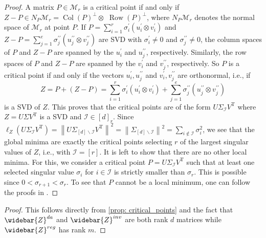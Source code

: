 \documentclass{article}
\newcommand{\T}{\mathrm{T}}
\theoremstyle{plain}
\theoremstyle{definition}
\theoremstyle{remark}
\theoremstyle{remark}
\begin{document}
 \begin{proof}
  A matrix $P \in \mathcal{M}_r$ is a critical point if and only if $Z-P \in N_P \mathcal{M}_r=\operatorname{Col}(P)^{\perp} \otimes$ $\operatorname{Row}(P)^{\perp}$, where $N_P \mathcal{M}_r$ denotes the normal space of $\mathcal{M}_r$ at point $P$. 
  If $P=\sum_{i=1}^r \sigma_i^{\prime}\left(u_i^{\prime} \otimes v_i^{\prime}\right)$ and $Z-P=\sum_{j=1}^e \sigma_j^{\prime \prime}\left(u_j^{\prime \prime} \otimes v_j^{\prime \prime}\right)$ are SVD with $\sigma_i^{\prime} \neq 0$ and $\sigma_j^{\prime \prime} \neq 0$, the column spaces of $P$ and $Z-P$ are spanned by the $u_i^{\prime}$ and $u_j^{\prime \prime}$, respectively. Similarly, the row spaces of $P$ and $Z-P$ are spanned by the $v_i^{\prime}$ and $v_j^{\prime \prime}$, respectively. So $P$ is a critical point if and only if the vectors $u_i^{\prime}, u_j^{\prime \prime}$ and $v_i^{\prime}, v_j^{\prime \prime}$ are orthonormal, i.e., if
  \begin{equation*}
    Z=P+\left(Z-P\right)=\sum_{i=1}^r \sigma_i^{\prime}\left(u_i^{\prime} \otimes v_i^{\prime}\right)+\sum_{j=1}^e \sigma_j^{\prime \prime}\left(u_j^{\prime \prime} \otimes v_j^{\prime \prime}\right)
  \end{equation*}
  is a SVD of $Z$. This proves that the critical points are of the form $U \Sigma_{\mathcal{I}} V^\T$ where $Z=U \Sigma V^\T$ is a SVD and $\mathcal{I} \in[d]_r$. Since $\ell_{Z}\left(U \Sigma_{\mathcal{I}} V^\T\right)=\left\|U \Sigma_{[d] \backslash \mathcal{I}} V^\T\right\|^2=\left\|\Sigma_{[d] \backslash \mathcal{I}}\right\|^2=\sum_{i \notin \mathcal{I}} \sigma_i^2$, we see that the global minima are exactly the critical points selecting $r$ of the largest singular values of $Z$, i.e., with $\mathcal{I}=[r]$. It is left to show that there are no other local minima. For this, we consider a critical point $P=U \Sigma_{\mathcal{I}} V^\T$ such that at least one selected singular value $\sigma_i$ for $i \in \mathcal{I}$ is strictly smaller than $\sigma_r$. This is possible since $0 < \sigma_{r+1} < \sigma_r$. To see that $P$ cannot be a local minimum, one can follow the proofs in \citep[Theorem 28]{Trager2020Pure}.
 \end{proof}

 \corcritcalpoints*
 \begin{proof}
  This follows directly from \autoref{prop: critical_points} and the fact that $\widebar{Z}^{da}$ and $\widebar{Z}^{inv}$ are both rank $d$ matrices while $\widebar{Z}^{reg}$ has rank $m$.
 \end{proof}
\end{document}
